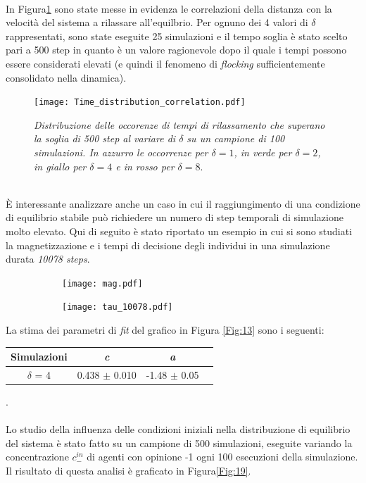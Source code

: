 \documentclass[letterpaper,10pt]{article}
\begin{document}
\\In Figura\ref{Fig:123} sono state messe in evidenza le correlazioni della distanza con la velocità del sistema a rilassare all'equilbrio. Per ognuno dei 4 valori di $\delta$ rappresentati, sono state eseguite 25 simulazioni e il tempo soglia è stato scelto pari a 500 step in quanto è un valore ragionevole dopo il quale i tempi possono essere considerati elevati (e quindi il fenomeno di \textit{flocking} sufficientemente consolidato nella dinamica).
\\
\begin{figure}[h!!]
\centering
\texttt{[image: Time\_distribution\_correlation.pdf]}
\caption{\textit{Distribuzione delle occorenze di tempi di rilassamento che superano la soglia di 500 step al variare di $\delta$ su un campione di 100 simulazioni. In azzurro le occorrenze per $\delta=1$, in verde per $\delta=2$, in giallo per $\delta=4$ e in rosso per $\delta=8$}.}
\label{Fig:123}
\end{figure}
\\
È interessante analizzare anche un caso in cui il raggiungimento di una condizione di equilibrio stabile può richiedere un numero di step temporali di simulazione molto elevato. Qui di seguito è stato riportato un esempio in cui si sono studiati la magnetizzazione
e i tempi di decisione degli individui in una simulazione durata \textit{10078 steps}.

\begin{figure}[h]
\centering
\begin{subfigure}[h]{0.9\linewidth}
\texttt{[image: mag.pdf]}
\end{subfigure}
\qquad
\begin{subfigure}[h]{0.9\linewidth}
\texttt{[image: tau\_10078.pdf]}
\end{subfigure}
\label{Fig:18}
\end{figure}
\bigskip
La stima dei parametri di \textit{fit} del grafico in Figura \ref{Fig:13} sono i seguenti:\\
\begin{center}
\begin{tabular}{ |c|c|c|c| } 
\hline
 Simulazioni & \textit{c} & \textit{a} \\
\hline
\multirow{1}{3em}{$\delta$ = 4 }
& 0.438 $\pm$ 0.010 & -1.48 $\pm$ 0.05 \\ 
\hline
\end{tabular}
\end{center}.
\bigskip
\\\\Lo studio della influenza delle condizioni iniziali nella distribuzione di equilibrio del sistema è stato fatto su un campione di 500 simulazioni, eseguite variando la concentrazione $c^{in}_{-}$ di agenti con opinione -1 ogni 100 esecuzioni della simulazione. Il risultato di questa analisi è graficato in Figura\ref{Fig:19}.
\end{document}

